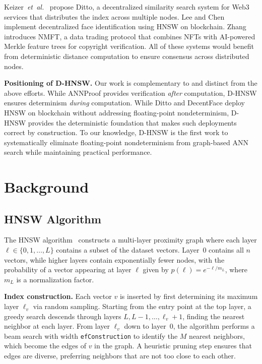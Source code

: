 \documentclass[10pt,journal]{IEEEtran}
\newcommand{\dhnsw}{\textsc{D-HNSW}}
\newcommand{\hnsw}{\textsc{HNSW}}
\newcommand{\etal}{\textit{et~al.}}
\begin{document}
Keizer~\etal{}~\cite{keizer2023ditto} propose Ditto, a decentralized similarity search system for Web3 services that distributes the index across multiple nodes. Lee and Chen~\cite{lee2024decentface} implement decentralized face identification using \hnsw{} on blockchain. Zhang~\cite{zhang2024nmft} introduces NMFT, a data trading protocol that combines NFTs with AI-powered Merkle feature trees for copyright verification. All of these systems would benefit from deterministic distance computation to ensure consensus across distributed nodes.

\textbf{Positioning of \dhnsw{}.} Our work is complementary to and distinct from the above efforts. While ANNProof provides verification \emph{after} computation, \dhnsw{} ensures determinism \emph{during} computation. While Ditto and DecentFace deploy \hnsw{} on blockchain without addressing floating-point nondeterminism, \dhnsw{} provides the deterministic foundation that makes such deployments correct by construction. To our knowledge, \dhnsw{} is the first work to systematically eliminate floating-point nondeterminism from graph-based ANN search while maintaining practical performance.

\section{Background}
\label{sec:background}

\subsection{HNSW Algorithm}

The \hnsw{} algorithm~\cite{malkov2020hnsw} constructs a multi-layer proximity graph where each layer $\ell \in \{0, 1, \ldots, L\}$ contains a subset of the dataset vectors. Layer~0 contains all $n$ vectors, while higher layers contain exponentially fewer nodes, with the probability of a vector appearing at layer $\ell$ given by $p(\ell) = e^{-\ell / m_L}$, where $m_L$ is a normalization factor.

\textbf{Index construction.} Each vector $v$ is inserted by first determining its maximum layer $\ell_v$ via random sampling. Starting from the entry point at the top layer, a greedy search descends through layers $L, L{-}1, \ldots, \ell_v{+}1$, finding the nearest neighbor at each layer. From layer $\ell_v$ down to layer~0, the algorithm performs a beam search with width \texttt{efConstruction} to identify the $M$ nearest neighbors, which become the edges of $v$ in the graph. A heuristic pruning step ensures that edges are diverse, preferring neighbors that are not too close to each other.
\end{document}
